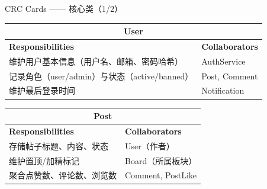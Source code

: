 \documentclass[aspectratio=169,UTF8]{ctexbeamer}
\begin{document}
\begin{frame}{CRC Cards —— 核心类（1/2）}
    \small
    \centering
    \begin{tabular}{|p{4.8cm}|p{4.8cm}|}
        \hline
        \multicolumn{2}{|c|}{\textbf{User}} \\
        \hline
        \textbf{Responsibilities} & \textbf{Collaborators} \\
        \hline
        维护用户基本信息（用户名、邮箱、密码哈希） & AuthService \\
        记录角色（user/admin）与状态（active/banned） & Post, Comment \\
        维护最后登录时间 & Notification \\
        \hline
    \end{tabular}
    \vspace{0.3cm}

    \begin{tabular}{|p{4.8cm}|p{4.8cm}|}
        \hline
        \multicolumn{2}{|c|}{\textbf{Post}} \\
        \hline
        \textbf{Responsibilities} & \textbf{Collaborators} \\
        \hline
        存储帖子标题、内容、状态 & User（作者） \\
        维护置顶/加精标记 & Board（所属板块） \\
        聚合点赞数、评论数、浏览数 & Comment, PostLike \\
        \hline
    \end{tabular}
\end{frame}
\end{document}
